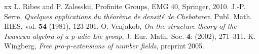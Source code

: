 \documentclass[12pt,a4paper,twoside,english]{smfart}
\begin{document}
\begin{thebibliography}{xx}
 L. Ribes and P. Zalesskii, Profinite Groups, EMG 40, Springer, 2010.
 J.-P. Serre, {\em Quelques applications du th\'eor\`eme de densit\'e de Chebotarev}, Publ. Math. IHES, vol. {\bf 54} (1981), 123-201. 
  O. Venjakob, {\em On the structure theory of the Iwasawa algebra of a p-adic Lie group}, J. Eur. Math. Soc. {\bf 4}: (2002), 271–311.
K. Wingberg, {\em Free pro-$p$-extensions of number fields}, preprint 2005.
\end{thebibliography}
\end{document}
